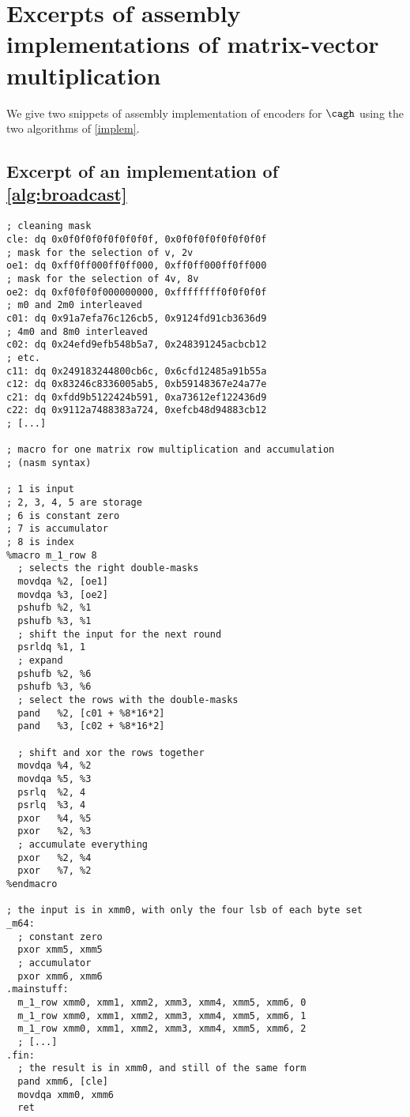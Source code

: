 \FloatBarrier

\section{Excerpts of assembly implementations of matrix-vector multiplication}

We give two snippets of assembly implementation of encoders for $\cagh$
using the two algorithms of \autoref{implem}.

\subsection{Excerpt of an implementation of \autoref{alg:broadcast}}
\label{app:gene}

\begin{verbatim}
; cleaning mask
cle: dq 0x0f0f0f0f0f0f0f0f, 0x0f0f0f0f0f0f0f0f
; mask for the selection of v, 2v
oe1: dq 0xff0ff000ff0ff000, 0xff0ff000ff0ff000
; mask for the selection of 4v, 8v
oe2: dq 0xf0f0f0f000000000, 0xffffffff0f0f0f0f
; m0 and 2m0 interleaved
c01: dq 0x91a7efa76c126cb5, 0x9124fd91cb3636d9
; 4m0 and 8m0 interleaved
c02: dq 0x24efd9efb548b5a7, 0x248391245acbcb12
; etc.
c11: dq 0x249183244800cb6c, 0x6cfd12485a91b55a
c12: dq 0x83246c8336005ab5, 0xb59148367e24a77e
c21: dq 0xfdd9b5122424b591, 0xa73612ef122436d9
c22: dq 0x9112a7488383a724, 0xefcb48d94883cb12
; [...]

; macro for one matrix row multiplication and accumulation
; (nasm syntax)

; 1 is input
; 2, 3, 4, 5 are storage
; 6 is constant zero
; 7 is accumulator
; 8 is index
%macro m_1_row 8
  ; selects the right double-masks
  movdqa %2, [oe1]
  movdqa %3, [oe2]
  pshufb %2, %1 
  pshufb %3, %1
  ; shift the input for the next round
  psrldq %1, 1
  ; expand
  pshufb %2, %6
  pshufb %3, %6
  ; select the rows with the double-masks
  pand   %2, [c01 + %8*16*2]
  pand   %3, [c02 + %8*16*2]

  ; shift and xor the rows together
  movdqa %4, %2
  movdqa %5, %3
  psrlq  %2, 4
  psrlq  %3, 4
  pxor   %4, %5
  pxor   %2, %3
  ; accumulate everything
  pxor   %2, %4 
  pxor   %7, %2
%endmacro

; the input is in xmm0, with only the four lsb of each byte set
_m64:
  ; constant zero
  pxor xmm5, xmm5
  ; accumulator
  pxor xmm6, xmm6
.mainstuff:
  m_1_row xmm0, xmm1, xmm2, xmm3, xmm4, xmm5, xmm6, 0
  m_1_row xmm0, xmm1, xmm2, xmm3, xmm4, xmm5, xmm6, 1
  m_1_row xmm0, xmm1, xmm2, xmm3, xmm4, xmm5, xmm6, 2
  ; [...]
.fin:
  ; the result is in xmm0, and still of the same form
  pand xmm6, [cle]
  movdqa xmm0, xmm6
  ret
\end{verbatim}

